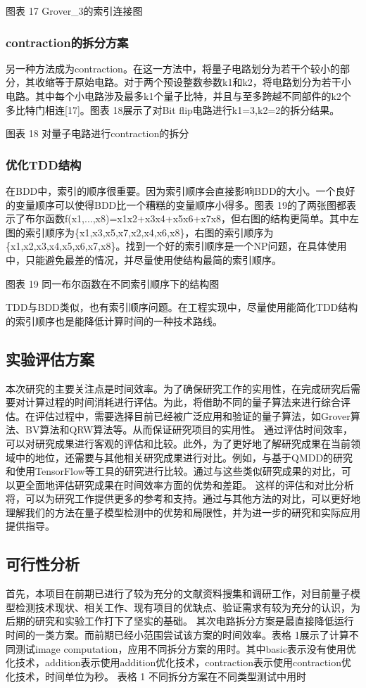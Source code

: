 图表 17 Grover\_3的索引连接图
\subsubsection{contraction的拆分方案}
另一种方法成为contraction。在这一方法中，将量子电路划分为若干个较小的部分，其收缩等于原始电路。对于两个预设整数参数k1和k2，将电路划分为若干小电路。其中每个小电路涉及最多k1个量子比特，并且与至多跨越不同部件的k2个多比特门相连[17]。图表 18展示了对Bit flip电路进行k1=3,k2=2的拆分结果。
 
图表 18 对量子电路进行contraction的拆分
\subsubsection{优化TDD结构}
在BDD中，索引的顺序很重要。因为索引顺序会直接影响BDD的大小。一个良好的变量顺序可以使得BDD比一个糟糕的变量顺序小得多。图表 19的了两张图都表示了布尔函数ƒ(x1,...,x8)=x1x2+x3x4+x5x6+x7x8，但右图的结构更简单。其中左图的索引顺序为\{x1,x3,x5,x7,x2,x4,x6,x8\}，右图的索引顺序为\{x1,x2,x3,x4,x5,x6,x7,x8\}。找到一个好的索引顺序是一个NP问题，在具体使用中，只能避免最差的情况，并尽量使用使结构最简的索引顺序。
 	 
图表 19 同一布尔函数在不同索引顺序下的结构图

TDD与BDD类似，也有索引顺序问题。在工程实现中，尽量使用能简化TDD结构的索引顺序也是能降低计算时间的一种技术路线。
\subsection{实验评估方案}
本次研究的主要关注点是时间效率。为了确保研究工作的实用性，在完成研究后需要对计算过程的时间消耗进行评估。为此，将借助不同的量子算法来进行综合评估。在评估过程中，需要选择目前已经被广泛应用和验证的量子算法，如Grover算法、BV算法和QRW算法等。从而保证研究项目的实用性。
通过评估时间效率，可以对研究成果进行客观的评估和比较。此外，为了更好地了解研究成果在当前领域中的地位，还需要与其他相关研究成果进行对比。例如，与基于QMDD的研究和使用TensorFlow等工具的研究进行比较。通过与这些类似研究成果的对比，可以更全面地评估研究成果在时间效率方面的优势和差距。
这样的评估和对比分析将，可以为研究工作提供更多的参考和支持。通过与其他方法的对比，可以更好地理解我们的方法在量子模型检测中的优势和局限性，并为进一步的研究和实际应用提供指导。
\subsection{可行性分析}
首先，本项目在前期已进行了较为充分的文献资料搜集和调研工作，对目前量子模型检测技术现状、相关工作、现有项目的优缺点、验证需求有较为充分的认识，为后期的研究和实验工作打下了坚实的基础。
其次电路拆分方案是最直接降低运行时间的一类方案。而前期已经小范围尝试该方案的时间效率。表格 1展示了计算不同测试image computation，应用不同拆分方案的用时。其中basic表示没有使用优化技术，addition表示使用addition优化技术，contraction表示使用contraction优化技术，时间单位为秒。
表格 1 不同拆分方案在不同类型测试中用时
